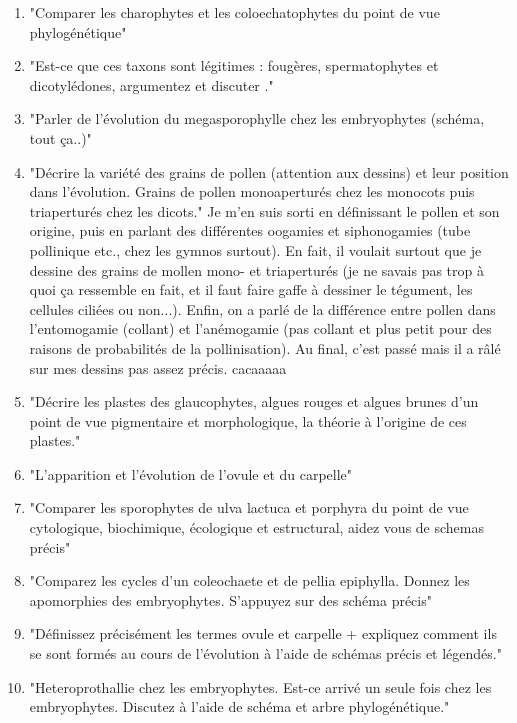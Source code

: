 \begin{enumerate}
	\item "Comparer les charophytes et les coloechatophytes du point de vue phylogénétique"
	
	\item "Est-ce que ces taxons sont légitimes : fougères, spermatophytes et dicotylédones, argumentez et discuter ."
	
	\item "Parler de l’évolution du megasporophylle chez les embryophytes (schéma, tout ça..)"
	
	\item "Décrire la variété des grains de pollen (attention aux dessins) et leur position dans l'évolution. Grains de pollen monoaperturés chez les monocots puis triaperturés chez les dicots." Je m'en suis sorti en définissant le pollen et son origine, puis en parlant des différentes oogamies et siphonogamies (tube pollinique etc., chez les gymnos surtout). En fait, il voulait surtout que je dessine des grains de mollen mono- et triaperturés (je ne savais pas trop à quoi ça ressemble en fait, et il faut faire gaffe à dessiner le tégument, les cellules ciliées ou non...). Enfin, on a parlé de la différence entre pollen dans l'entomogamie (collant) et l'anémogamie (pas collant et plus petit pour des raisons de probabilités de la pollinisation). Au final, c'est passé mais il a râlé sur mes dessins pas assez précis. cacaaaaa
	
	\item "Décrire les plastes des glaucophytes, algues rouges et algues brunes d'un point de vue pigmentaire et morphologique, la théorie à l'origine de ces plastes."
	
	\item "L'apparition et l'évolution de l'ovule et du carpelle"
	
	\item "Comparer les sporophytes de ulva lactuca et porphyra du point de vue cytologique, biochimique, écologique et estructural, aidez vous de schemas précis"
	
	\item "Comparez les cycles d'un coleochaete et de pellia epiphylla. Donnez les apomorphies des embryophytes. S'appuyez sur des schéma précis"
	
	\item "Définissez précisément les termes ovule et carpelle + expliquez comment ils se sont formés au cours de l'évolution à l'aide de schémas précis et légendés."
	
	\item "Heteroprothallie chez les embryophytes. Est-ce arrivé un seule fois chez les embryophytes. Discutez à l'aide de schéma et arbre phylogénétique."
	

\end{enumerate}

